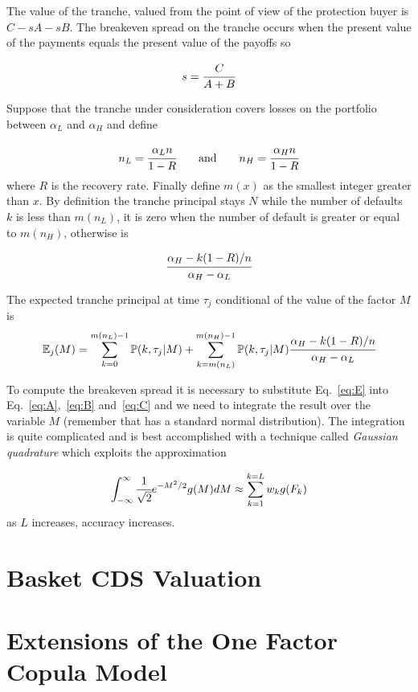 The value of the tranche, valued from the point of view of the protection buyer is $C-sA-sB$. The breakeven spread 
on the tranche occurs when the present value of the payments equals the present value of the payoffs so

\[ s = \cfrac{C}{A+B}\]

Suppose that the tranche under consideration covers losses on the portfolio between $\alpha_L$ and $\alpha_H$ and
define

\[n_L = \cfrac{\alpha_L n}{1-R}\qquad \mathrm{and}\qquad n_H = \cfrac{\alpha_H n}{1-R}\]
where $R$ is the recovery rate. Finally define $m(x)$ as the smallest integer greater than $x$.
By definition the tranche principal stays $N$ while the number of defaults $k$ is less than $m(n_L)$, it 
is zero when the number of default is greater or equal to $m(n_H)$, otherwise is

\[\cfrac{\alpha_H -k(1-R)/n}{\alpha_H - \alpha_L}\]

The expected tranche principal at time $\tau_j$ conditional of the value of the factor $M$ is
\begin{equation}
\mathbb{E}_j(M) = \sum_{k=0}^{m(n_L)-1}\mathbb{P}(k, \tau_j|M) + \sum_{k=m(n_L)}^{m(n_H)-1}\mathbb{P}(k, \tau_j|M) \cfrac{\alpha_H -k(1-R)/n}{\alpha_H - \alpha_L}
\label{eq:E}
\end{equation}

To compute the breakeven spread it is necessary to substitute Eq.~\ref{eq:E} into Eq.~\ref{eq:A},~\ref{eq:B} and~\ref{eq:C}
and we need to integrate the result over the variable $M$ (remember that has a standard normal distribution). 
The integration is quite complicated and is best accomplished with a technique called \emph{Gaussian quadrature} which
exploits the approximation

\[\int_{-\infty}^{\infty}{\cfrac{1}{\sqrt{2}}e^{-M^{2}/2}g(M)dM} \approx \sum_{k=1}^{k=L}w_k g(F_k)\]
as $L$ increases, accuracy increases.

\section{Basket CDS Valuation}

\section{Extensions of the One Factor Copula Model}

